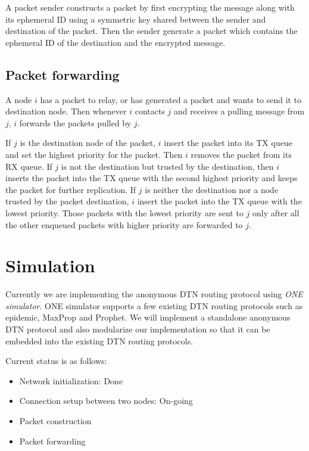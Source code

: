 \documentclass[11pt]{article}
\begin{document}
A packet sender constructs a packet by first encrypting the message along with its ephemeral ID using a symmetric key shared between the sender and destination of the packet. 
Then the sender generate a packet which contains the ephemeral ID of the destination and the encrypted message.



\subsection{Packet forwarding}

A node $i$ has a packet to relay, or has generated a packet and wants to send it to destination node.  
Then whenever $i$ contacts $j$ and receives a pulling message from $j$, $i$ forwards the packets pulled by $j$. 

If $j$ is the destination node of the packet, $i$ insert the packet into its TX queue and set the highest priority for the packet. 
Then $i$ removes the packet from its RX queue. 
If $j$ is not the destination but trusted by the destination, then $i$ inserts the packet into the TX queue with the second highest priority and keeps the packet for further replication.
If $j$ is neither the destination nor a node trusted by the packet destination, $i$ insert the packet into the TX queue with the lowest priority. 
Those packets with the lowest priority are sent to $j$ only after all the other enqueued packets with higher priority are forwarded to $j$.



\section{Simulation}
Currently we are implementing the anonymous DTN routing protocol using \textit{ONE simulator}.
ONE simulator supports a few existing DTN routing protocols such as epidemic, MaxProp and Prophet.  
We will implement a standalone anonymous DTN protocol and also modularize our implementation so that it can be embedded into the existing DTN routing protocols. 

Current status is as follows:
\begin{itemize}
  \item Network initialization: Done
  \item Connection setup between two nodes: On-going
  \item Packet construction
  \item Packet forwarding
\end{itemize}
\end{document}
